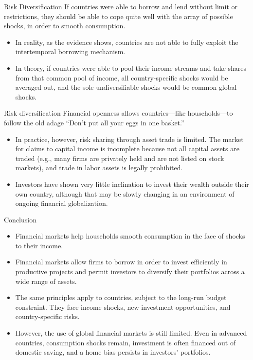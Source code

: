 \documentclass[
  ignorenonframetext,
]{beamer}
\begin{document}
\begin{frame}{Risk Diversification}
\label{risk-diversification-5}
If countries were able to borrow and lend without limit or restrictions,
they should be able to cope quite well with the array of possible
shocks, in order to smooth consumption.

\begin{itemize}
\item
  In reality, as the evidence shows, countries are not able to fully
  exploit the intertemporal borrowing mechanism.
\item
  In theory, if countries were able to pool their income streams and
  take shares from that common pool of income, all country-specific
  shocks would be averaged out, and the sole undiversifiable shocks
  would be common global shocks.
\end{itemize}
\end{frame}

\begin{frame}{Risk diversification}
\label{risk-diversification-6}
Financial openness allows countries---like households---to follow the
old adage ``Don't put all your eggs in one basket.''

\begin{itemize}
\item
  In practice, however, risk sharing through asset trade is limited. The
  market for claims to capital income is incomplete because not all
  capital assets are traded (e.g., many firms are privately held and are
  not listed on stock markets), and trade in labor assets is legally
  prohibited.
\item
  Investors have shown very little inclination to invest their wealth
  outside their own country, although that may be slowly changing in an
  environment of ongoing financial globalization.
\end{itemize}
\end{frame}

\begin{frame}{Conclusion}
\label{conclusion-1}
\begin{itemize}
\item
  Financial markets help households smooth consumption in the face of
  shocks to their income.
\item
  Financial markets allow firms to borrow in order to invest efficiently
  in productive projects and permit investors to diversify their
  portfolios across a wide range of assets.
\item
  The same principles apply to countries, subject to the long-run budget
  constraint. They face income shocks, new investment opportunities, and
  country-specific risks.
\item
  However, the use of global financial markets is still limited. Even in
  advanced countries, consumption shocks remain, investment is often
  financed out of domestic saving, and a home bias persists in
  investors' portfolios.
\end{itemize}
\end{frame}
\end{document}
